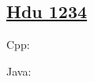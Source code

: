 \subsection{\href{https://www.weblink.com}{Hdu 1234}}\label{app:codelist:hdu:1234}

Cpp:\par


Java:\par


